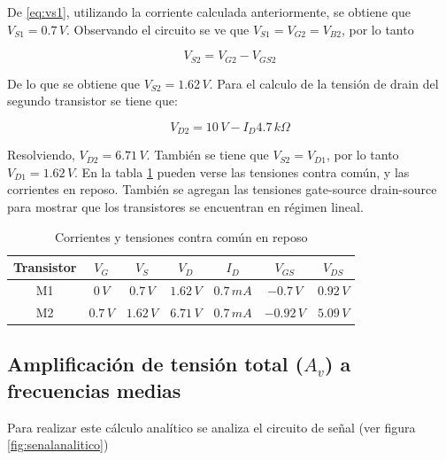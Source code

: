 \documentclass[10pt,spanish,a4paper,notitlepage]{article}
\begin{document}
De \ref{eq:vs1}, utilizando la corriente calculada anteriormente, se obtiene que $V_{S1}=0.7\,\unit{V}$. Observando el circuito se ve que $V_{S1}=V_{G2}=V_{B2}$, por lo tanto 

\begin{equation}
    V_{S2}=V_{G2}-V_{GS2}
    \label{eq:vs2}
\end{equation}

De lo que se obtiene que $V_{S2}=1.62\,\unit{V}$. Para el calculo de la tensión de drain del segundo transistor se tiene que:

\begin{equation}
    V_{D2}= 10\,\unit{V}-I_D 4.7\,\unit{k\Omega}
    \label{eq:vd2}
\end{equation}

Resolviendo, $V_{D2}=6.71\,\unit{V}$. También se tiene que $V_{S2}=V_{D1}$, por lo tanto $V_{D1}=1.62\,\unit{V}$. En la tabla \ref{table:valoresreposo} pueden verse las tensiones contra común, y las corrientes en reposo. También se agregan las tensiones gate-source drain-source para mostrar que los transistores se encuentran en régimen lineal.


\begin{table}[H]
\centering
\begin{tabular}{|c|c|c|c|c|c|c|} 
\hline
Transistor & $V_{G}$ & $V_{S}$ & $V_{D}$ & $I_{D}$ & $V_{GS}$ & $V_{DS}$  \\ \hline
M1 & $0\,\unit{V}$ & $0.7\,\unit{V}$  & $1.62\,\unit{V}$ & $0.7\,\unit{mA}$ & $-0.7\,\unit{V}$  & $0.92\,\unit{V}$ \\ \hline
M2 & $0.7\,\unit{V}$ & $1.62\,\unit{V}$ & $6.71\,\unit{V}$ & $0.7\,\unit{mA}$ & $-0.92\,\unit{V}$ & $5.09\,\unit{V}$\\ \hline
\end{tabular}
\caption{Corrientes y tensiones contra común en reposo}
\label{table:valoresreposo}
\end{table}


\subsection{Amplificación de tensión total (\texorpdfstring{$A_v$}{TEXT}) a frecuencias medias}

Para realizar este cálculo analítico se analiza el circuito de señal (ver figura \ref{fig:senalanalitico})
\end{document}
